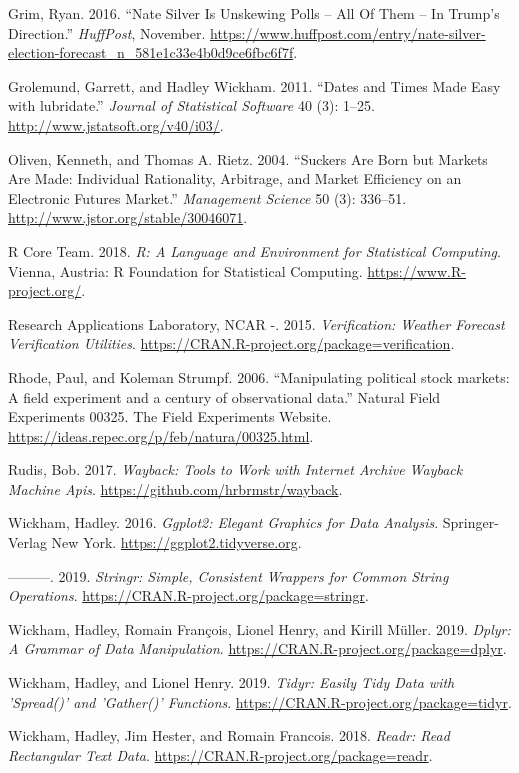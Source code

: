 \documentclass[11pt,]{article}
\begin{document}
\leavevmode\hypertarget{ref-grim16wrong}{}%
Grim, Ryan. 2016. ``Nate Silver Is Unskewing Polls -- All Of Them -- In
Trump's Direction.'' \emph{HuffPost}, November.
\url{https://www.huffpost.com/entry/nate-silver-election-forecast_n_581e1c33e4b0d9ce6fbc6f7f}.

\leavevmode\hypertarget{ref-lubridate}{}%
Grolemund, Garrett, and Hadley Wickham. 2011. ``Dates and Times Made
Easy with lubridate.'' \emph{Journal of Statistical Software} 40 (3):
1--25. \url{http://www.jstatsoft.org/v40/i03/}.

\leavevmode\hypertarget{ref-oliven04suckers}{}%
Oliven, Kenneth, and Thomas A. Rietz. 2004. ``Suckers Are Born but
Markets Are Made: Individual Rationality, Arbitrage, and Market
Efficiency on an Electronic Futures Market.'' \emph{Management Science}
50 (3): 336--51. \url{http://www.jstor.org/stable/30046071}.

\leavevmode\hypertarget{ref-base}{}%
R Core Team. 2018. \emph{R: A Language and Environment for Statistical
Computing}. Vienna, Austria: R Foundation for Statistical Computing.
\url{https://www.R-project.org/}.

\leavevmode\hypertarget{ref-verification}{}%
Research Applications Laboratory, NCAR -. 2015. \emph{Verification:
Weather Forecast Verification Utilities}.
\url{https://CRAN.R-project.org/package=verification}.

\leavevmode\hypertarget{ref-rhode06manip}{}%
Rhode, Paul, and Koleman Strumpf. 2006. ``Manipulating political stock
markets: A field experiment and a century of observational data.''
Natural Field Experiments 00325. The Field Experiments Website.
\url{https://ideas.repec.org/p/feb/natura/00325.html}.

\leavevmode\hypertarget{ref-wayback}{}%
Rudis, Bob. 2017. \emph{Wayback: Tools to Work with Internet Archive
Wayback Machine Apis}. \url{https://github.com/hrbrmstr/wayback}.

\leavevmode\hypertarget{ref-ggplot2}{}%
Wickham, Hadley. 2016. \emph{Ggplot2: Elegant Graphics for Data
Analysis}. Springer-Verlag New York.
\url{https://ggplot2.tidyverse.org}.

\leavevmode\hypertarget{ref-stringr}{}%
---------. 2019. \emph{Stringr: Simple, Consistent Wrappers for Common
String Operations}. \url{https://CRAN.R-project.org/package=stringr}.

\leavevmode\hypertarget{ref-dplyr}{}%
Wickham, Hadley, Romain François, Lionel Henry, and Kirill Müller. 2019.
\emph{Dplyr: A Grammar of Data Manipulation}.
\url{https://CRAN.R-project.org/package=dplyr}.

\leavevmode\hypertarget{ref-tidyr}{}%
Wickham, Hadley, and Lionel Henry. 2019. \emph{Tidyr: Easily Tidy Data
with 'Spread()' and 'Gather()' Functions}.
\url{https://CRAN.R-project.org/package=tidyr}.

\leavevmode\hypertarget{ref-readr}{}%
Wickham, Hadley, Jim Hester, and Romain Francois. 2018. \emph{Readr:
Read Rectangular Text Data}.
\url{https://CRAN.R-project.org/package=readr}.




\newpage
\singlespacing 
\end{document}
